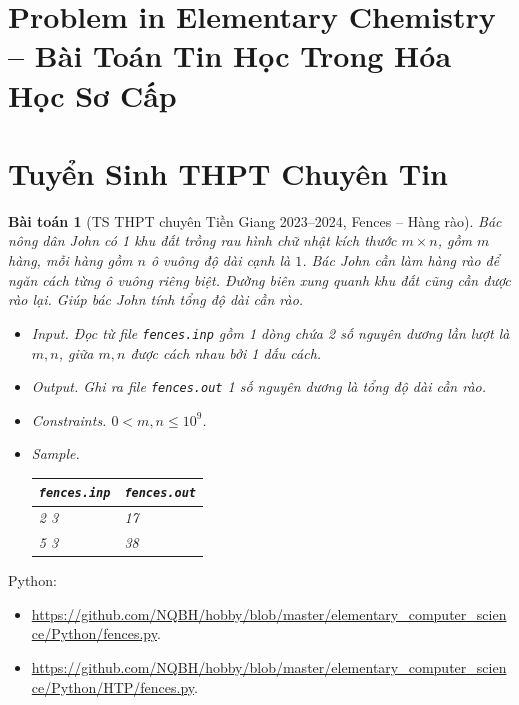 \documentclass{article}
\newtheorem{baitoan}{Bài toán}
\begin{document}

\section{Problem in Elementary Chemistry -- Bài Toán Tin Học Trong Hóa Học Sơ Cấp}


\section{Tuyển Sinh THPT Chuyên Tin}

\begin{baitoan}[TS THPT chuyên Tiền Giang 2023--2024, Fences -- Hàng rào]
	Bác nông dân John có 1 khu đất trồng rau hình chữ nhật kích thước $m\times n$, gồm $m$ hàng, mỗi hàng gồm $n$ ô vuông độ dài cạnh là $1$. Bác John cần làm hàng rào để ngăn cách từng ô vuông riêng biệt. Đường biên xung quanh  khu đất cũng cần được rào lại. Giúp bác John tính tổng độ dài cần rào.
	\begin{itemize}
		\item {\sf Input.} Đọc từ file \verb|fences.inp| gồm 1 dòng chứa 2 số nguyên dương lần lượt là $m,n$, giữa $m,n$ được cách nhau bởi 1 dấu cách.
		\item {\sf Output.} Ghi ra file \verb|fences.out| 1 số nguyên dương là tổng độ dài cần rào.
		\item {\sf Constraints.} $0 < m,n\le10^9$.
		\item {\sf Sample.}
		\begin{table}[H]
			\centering
			\begin{tabular}{|l|l|}
				\hline
				{\tt fences.inp} & {\tt fences.out} \\
				\hline
				2 3 & 17 \\
				\hline
				5 3 & 38 \\
				\hline
			\end{tabular}
		\end{table}
	\end{itemize}
\end{baitoan}
Python:
\begin{itemize}
	\item \url{https://github.com/NQBH/hobby/blob/master/elementary_computer_science/Python/fences.py}.
	\item \url{https://github.com/NQBH/hobby/blob/master/elementary_computer_science/Python/HTP/fences.py}.
\end{itemize}
\end{document}
